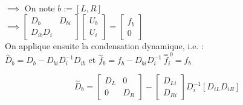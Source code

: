 \documentclass[12pt,a4paper]{article}
\begin{document}
\begin{sol}
		$\implies$ On note $b := [L,R]$\\
		$\implies \left[\begin{matrix}
			D_b & D_{bi} \\
			D_{ib} D_i
		\end{matrix}\right]\left[\begin{matrix}
			U_b \\ U_i
		\end{matrix}\right] = \left[\begin{matrix}
			f_b \\ 0
		\end{matrix}\right]$\\
		On applique ensuite la condensation dynamique, i.e. :\\
		$ \overset\sim D_b = D_b - D_{bi}D_i^{-1}D_{ib}$ et $\overset\sim f_b = f_b-D_{bi}D_i^{-1}\overset{=0}{f_i} = f_b$
		
		\[
		\overset\sim D_b = \left[\begin{matrix}
			D_L & 0 \\
			0 & D_R
		\end{matrix}\right] - \left[\begin{matrix}
			D_{Li} \\ D_{Ri}
		\end{matrix}\right]D_i^{-1}\left[D_{iL}D_{iR}\right]
		\]
		

\end{sol}
\end{document}
